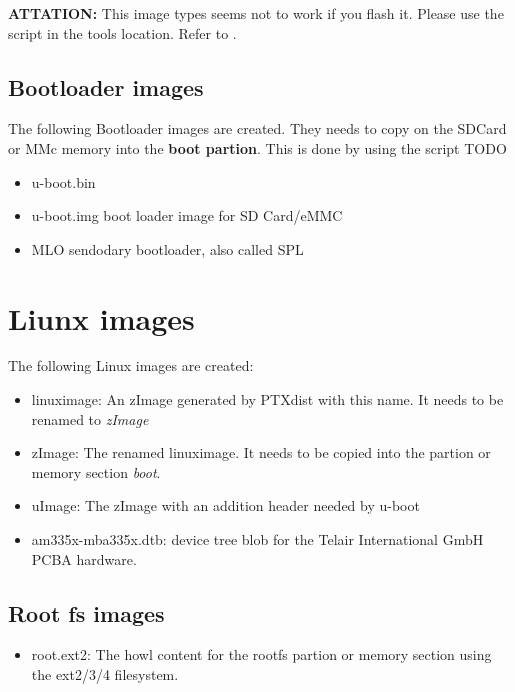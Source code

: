 \textbf{ATTATION:} This image types seems not to work if you flash it. Please
use the script in the tools location. Refer to .

\subsection{Bootloader images}%
\label{sec:bootloader_images}

The following Bootloader images are created. They needs to copy on the SDCard
or MMc memory into the \textbf{boot partion}. This is done by using the
script TODO %

\begin{itemize}
    \item u-boot.bin
    \item u-boot.img boot loader image for SD Card/eMMC
    \item MLO sendodary bootloader, also called \gls{SPL}
\end{itemize}


\section{Liunx images}%
\label{sec:liunx_images}

The following Linux images are created:

\begin{itemize}
    \item linuximage: An zImage generated by PTXdist with this name. It needs to
        be renamed to \textit{zImage}
    \item zImage: The renamed linuximage. It needs to be copied into the
        partion or memory section \textit{boot}.
    \item uImage: The zImage with an addition header needed by u-boot
    \item am335x-mba335x.dtb: device tree blob for the Telair International GmbH
        \newline \gls{PCBA} hardware.
\end{itemize}


\subsection{Root fs images}%
\label{sec:rootfs_imges}

\begin{itemize}
    \item root.ext2: The howl content for the rootfs partion or memory section
    using the ext2/3/4 filesystem.
\end{itemize}
